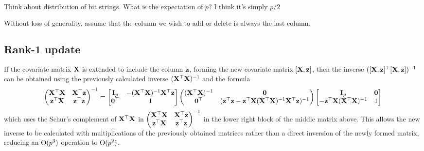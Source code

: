 \documentclass{amsart}[12pt]
\newcommand{\mgc}[1]{{\color{blue}#1}}
\begin{document}
\mgc{Think about distribution of bit strings. What is the expectation of $p$? I think it's simply $p/2$}

Without loss of generality, assume that the column we wish to add or delete is always the last column.
\subsection{Rank-1 update}

If the covariate matrix ${\bf X}$ is extended to include the column ${\bf z}$, forming the new covariate matrix $[{\bf X},
{\bf z}]$, then the inverse $([{\bf X}, {\bf z}]^\top [{\bf X}, {\bf z}])^{-1}$ can be obtained using the previously calculated
inverse $({\bf X}^\top {\bf X})^{-1}$ and the formula
\begin{equation}
\label{eq:blockinverse}
	\begin{pmatrix}
		{\bf X}^\top {\bf X} & {\bf X}^\top {\bf z} \\
		{\bf z}^\top {\bf X} & {\bf z}^\top {\bf z}
	\end{pmatrix}^{-1}
	=
	\begin{bmatrix}
		{\bf I}_p & -({\bf X}^\top {\bf X})^{-1} {\bf X}^\top {\bf z} \\
		{\bf 0}^\top & 1
	\end{bmatrix}
	\begin{pmatrix}
		({\bf X}^\top {\bf X})^{-1} & {\bf 0} \\
		{\bf 0}^\top & ({\bf z}^\top{\bf z} - {\bf z}^\top {\bf X}({\bf X}^\top {\bf X})^{-1} {\bf X}^\top {\bf z})^{-1}
	\end{pmatrix}
	\begin{bmatrix}
		{\bf I}_p & {\bf 0} \\
		-{\bf z}^\top {\bf X} ({\bf X}^\top {\bf X})^{-1} & 1
	\end{bmatrix}
\end{equation}
which uses the Schur's complement of ${\bf X}^\top {\bf X}$ in
$\begin{pmatrix}
	{\bf X}^\top {\bf X} & {\bf X}^\top {\bf z} \\
	{\bf z}^\top {\bf X} & {\bf z}^\top {\bf z}
\end{pmatrix}^{-1}$ in the lower right block of the middle matrix above. This allows the new inverse to be calculated with multiplications of the previously obtained matrices rather than a direct inversion of the newly 
formed matrix, reducing an $\text{O}(p^3)$ operation to $\text{O}(p^2)$.
\end{document}
